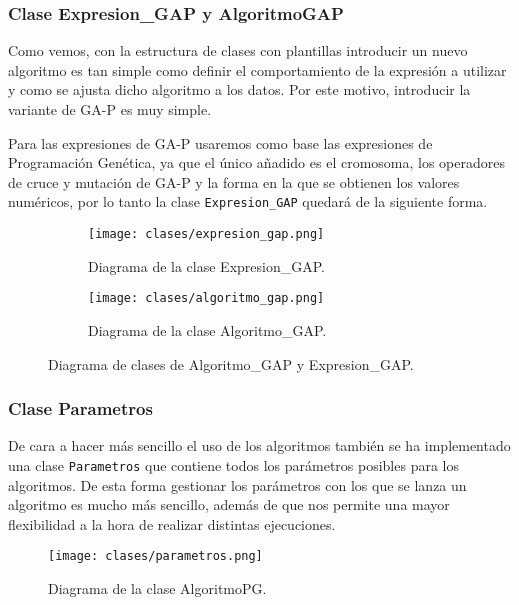 \newpage

\subsubsection{Clase Expresion\_GAP y AlgoritmoGAP}

Como vemos, con la estructura de clases con plantillas introducir un nuevo algoritmo es tan simple como definir el comportamiento de la expresión a utilizar y como se ajusta dicho algoritmo a los datos. Por este motivo, introducir la variante de GA-P es muy simple.

Para las expresiones de GA-P usaremos como base las expresiones de Programación Genética, ya que el único añadido es el cromosoma, los operadores de cruce y mutación de GA-P y la forma en la que se obtienen los valores numéricos, por lo tanto la clase \texttt{Expresion\_GAP} quedará de la siguiente forma.



\begin{figure}[H]
    \centering
	 \begin{subfigure}[b]{0.49\textwidth}
		 \centering
		 \texttt{[image: clases/expresion\_gap.png]}
		 \caption{Diagrama de la clase Expresion\_GAP.}
		\label{fig:diagrama_clase_expresion_gap}
	 \end{subfigure}
	\begin{subfigure}[b]{0.49\textwidth}
		 \centering
		 \texttt{[image: clases/algoritmo\_gap.png]}
 		\caption{Diagrama de la clase Algoritmo\_GAP.}
 	  \label{fig:diagrama_clase_algoritmo_gap}
   \end{subfigure}

	\caption{Diagrama de clases de Algoritmo\_GAP y Expresion\_GAP.}
	\label{fig:diagrama_clases_gap}
\end{figure}


\subsubsection{Clase Parametros}

De cara a hacer más sencillo el uso de los algoritmos también se ha implementado una clase \texttt{Parametros} que contiene todos los parámetros posibles para los algoritmos. De esta forma gestionar los parámetros con los que se lanza un algoritmo es mucho más sencillo, además de que nos permite una mayor flexibilidad a la hora de realizar distintas ejecuciones.

\begin{figure}[H]
	 \centering
	 \texttt{[image: clases/parametros.png]}
	 \caption{Diagrama de la clase AlgoritmoPG.}
	\label{fig:diagrama_clase_parametros}
\end{figure}


